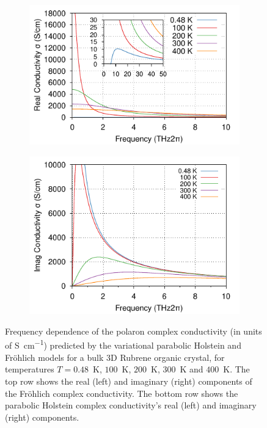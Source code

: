 \begin{figure}[!tbp]
\begin{subfigure}[b]{0.49\textwidth}
    \includegraphics[width=\textwidth]{figures/rubrene-holstein-real-conductivity-temp-0.4to400K-freq-0to10omega-COLOUR.pdf}
  \end{subfigure}
  \hfill
  \begin{subfigure}[b]{0.49\textwidth}
    \centering
    \includegraphics[width=\textwidth]{figures/rubrene-holstein-imag-conductivity-temp-0.4to400K-freq-0to10omega-COLOUR.pdf}
  \end{subfigure}
  \caption{Frequency dependence of the polaron complex conductivity (in units of \si{\siemens\per\centi\meter}) predicted by the variational parabolic Holstein and Fr\"ohlich models for a bulk 3D Rubrene organic crystal, for temperatures $T = 0.48$~\si{K}, $100$~\si{K}, $200$~\si{K}, $300$~\si{K} and $400$~\si{K}. The top row shows the real (left) and imaginary (right) components of the Fr\"ohlich complex conductivity. The bottom row shows the parabolic Holstein complex conductivity's real (left) and imaginary (right) components.}
  \label{fig:rubrene_conductivity}
\end{figure}

